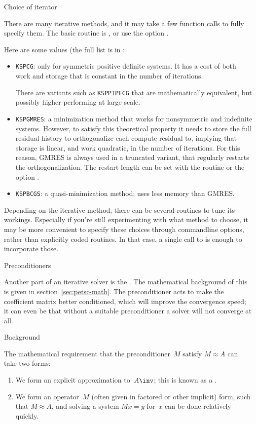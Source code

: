  {Choice of iterator}

There are many iterative methods, and it may take a few function calls
to fully specify them. The basic routine is ,
or use the option .

Here are some values (the full list is in :
\begin{itemize}
\item \lstinline{KSPCG}: only for symmetric positive definite systems.
  It has a cost of both work and storage that is constant in the number of iterations.

  There are variants such as \lstinline{KSPPIPECG} that are mathematically equivalent,
  but possibly higher performing at large scale.
\item \lstinline{KSPGMRES}: a minimization method that works for nonsymmetric
  and indefinite systems. However, to satisfy this theoretical property
  it needs to store the full residual history to orthogonalize each
  compute residual to, implying that storage
  is linear, and work quadratic, in the number of iterations.
  For this reason, GMRES is always used in a truncated variant, that regularly restarts
  the orthogonalization. The restart length can be set with the routine
   or the option .
\item \lstinline{KSPBCGS}: a quasi-minimization method; uses less memory than GMRES.
\end{itemize}

Depending on the iterative method, there can be several routines to tune its workings.
Especially if you're still experimenting with what method to choose,
it may be more convenient to specify these choices through commandline options,
rather than explicitly coded routines. In that case, a single call to
 is enough to incorporate those.

 {Preconditioners}

Another part of an iterative solver is the .
The mathematical background of this
is given in section~\ref{sec:petsc-math}.
The preconditioner acts to make the coefficient matrix better conditioned,
which will improve the convergence speed; it can even be that without
a suitable preconditioner a solver will not converge at all.

 {Background}

The mathematical requirement that the preconditioner~$M$
satisfy $M\approx A$ can take two forms:
\begin{enumerate}
\item We form an explicit approximation to~$A\inv$; this is known as a
  .
\item We form an operator~$M$ (often given in factored or other
  implicit) form, such that $M\approx A$, and solving a system $Mx=y$
  for~$x$ can be done relatively quickly.
\end{enumerate}

